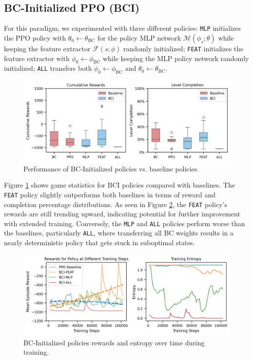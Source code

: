 \documentclass{article}
\begin{document}
\subsection{BC-Initialized PPO (BCI)}
For this paradigm, we experimented with three different policies: 
\texttt{MLP} initializes the PPO policy with $\theta_0 \leftarrow \theta_{\text{BC}}$ 
for the policy MLP network $\mathcal{M}(\phi_s; \theta)$ while keeping the feature 
extractor $\mathcal{F}(s;\phi)$ randomly initialized; \texttt{FEAT} initializes the 
feature extractor with $\phi_0 \leftarrow \phi_{\text{BC}}$ while keeping the MLP 
policy network randomly initialized; \texttt{ALL} transfers both $\phi_0 \leftarrow 
\phi_{\text{BC}}$ and $\theta_0 \leftarrow \theta_{\text{BC}}$.

\begin{figure}[htbp]
      \centering
      \includegraphics[width=\columnwidth]{figures/cum_rewards_bci.png}
      \caption{Performance of BC-Initialized policies vs. baseline policies.}
      \label{fig:res_bci}
\end{figure}

Figure \ref{fig:res_bci} shows game statistics for BCI policies compared 
with baselines. The \texttt{FEAT} policy slightly outperforms both baselines in 
terms of reward and completion percentage distributions. As seen in 
Figure \ref{fig:res_bci_deepdive}, the \texttt{FEAT} policy's rewards 
are still trending upward, indicating potential for further improvement 
with extended training. Conversely, the \texttt{MLP} and \texttt{ALL} 
policies perform worse than the baselines, particularly \texttt{ALL}, 
where transferring all BC weights results in a nearly deterministic 
policy that gets stuck in suboptimal states.

\begin{figure}[htbp]
      \centering
      \includegraphics[width=\columnwidth]{figures/bci-training.png}
      \caption{BC-Initialized policies rewards and entropy over time during
      training.}
      \label{fig:res_bci_deepdive}
\end{figure}
\end{document}
